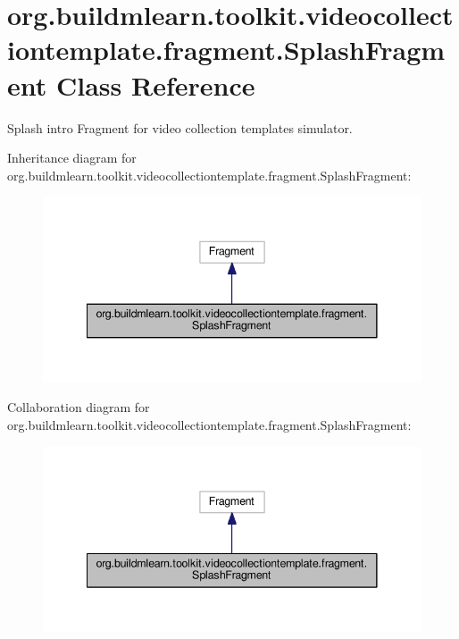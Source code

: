 \hypertarget{classorg_1_1buildmlearn_1_1toolkit_1_1videocollectiontemplate_1_1fragment_1_1SplashFragment}{}\section{org.\+buildmlearn.\+toolkit.\+videocollectiontemplate.\+fragment.\+Splash\+Fragment Class Reference}
\label{classorg_1_1buildmlearn_1_1toolkit_1_1videocollectiontemplate_1_1fragment_1_1SplashFragment}


Splash intro Fragment for video collection template\textquotesingle{}s simulator.  




Inheritance diagram for org.\+buildmlearn.\+toolkit.\+videocollectiontemplate.\+fragment.\+Splash\+Fragment\+:
\nopagebreak
\begin{figure}[H]
\begin{center}
\leavevmode
\includegraphics[width=341pt]{classorg_1_1buildmlearn_1_1toolkit_1_1videocollectiontemplate_1_1fragment_1_1SplashFragment__inherit__graph}
\end{center}
\end{figure}


Collaboration diagram for org.\+buildmlearn.\+toolkit.\+videocollectiontemplate.\+fragment.\+Splash\+Fragment\+:
\nopagebreak
\begin{figure}[H]
\begin{center}
\leavevmode
\includegraphics[width=341pt]{classorg_1_1buildmlearn_1_1toolkit_1_1videocollectiontemplate_1_1fragment_1_1SplashFragment__coll__graph}
\end{center}
\end{figure}
